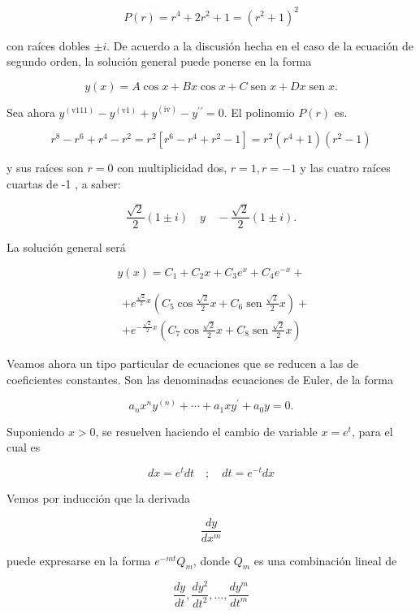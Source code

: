 \documentclass[10pt]{article}
\theoremstyle{plain}
\theoremstyle{definition}
\theoremstyle{remark}
\begin{document}
$$
P(r)=r^{4}+2 r^{2}+1=\left(r^{2}+1\right)^{2}
$$

con raíces dobles $\pm i$. De acuerdo a la discusión hecha en el caso de la ecuación de segundo orden, la solución general puede ponerse en la forma

$$
y(x)=A \cos x+B x \cos x+C \operatorname{sen} x+D x \operatorname{sen} x .
$$

Sea ahora $y^{(\mathrm{v} 111)}-y^{(\mathrm{v} 1)}+y^{(\mathrm{iv})}-y^{\prime \prime}=0$. El polinomio $P(r)$ es.

$$
r^{8}-r^{6}+r^{4}-r^{2}=r^{2}\left[r^{6}-r^{4}+r^{2}-1\right]=r^{2}\left(r^{4}+1\right)\left(r^{2}-1\right)
$$

y sus raíces son $r=0$ con multiplicidad dos, $r=1, r=-1$ y las cuatro raíces cuartas de -1 , a saber:

$$
\frac{\sqrt{2}}{2}(1 \pm i) \quad y \quad-\frac{\sqrt{2}}{2}(1 \pm i) .
$$

La solución general será

$$
y(x)=C_{1}+C_{2} x+C_{3} e^{x}+C_{4} e^{-x}+
$$


$$
\begin{aligned}
& +e^{\frac{\sqrt{2}}{2} x}\left(C_{5} \cos \frac{\sqrt{2}}{2} x+C_{6} \operatorname{sen} \frac{\sqrt{2}}{2} x\right)+ \\
& +e^{-\frac{\sqrt{2}}{2} x}\left(C_{7} \cos \frac{\sqrt{2}}{2} x+C_{8} \operatorname{sen} \frac{\sqrt{2}}{2} x\right)
\end{aligned}
$$

Veamos ahora un tipo particular de ecuaciones que se reducen a las de coeficientes constantes. Son las denominadas ecuaciones de Euler, de la forma


\begin{equation*}
a_{n} x^{n} y^{(n)}+\cdots+a_{1} x y^{\prime}+a_{0} y=0 . \tag{5-7}
\end{equation*}


Suponiendo $x>0$, se resuelven haciendo el cambio de variable $x=e^{t}$, para el cual es

$$
d x=e^{t} d t \quad ; \quad d t=e^{-t} d x
$$

Vemos por inducción que la derivada

$$
\frac{d y}{d x^{m}}
$$

puede expresarse en la forma $e^{-m t} Q_{m}$, donde $Q_{m}$ es una combinación lineal de

$$
\frac{d y}{d t}, \frac{d y^{2}}{d t^{2}}, \ldots, \frac{d y^{m}}{d t^{m}}
$$
\end{document}
